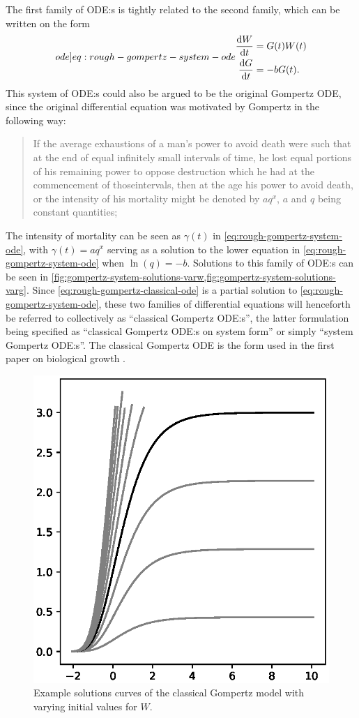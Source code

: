 The first family of ODE:s is tightly related to the second family, which can be written on the form
\begin{equation}
  \label[ode]{eq:rough-gompertz-system-ode}
  \begin{aligned} 
    \diff{W}{t} &= G(t) W(t)\\
    \diff{G}{t} &= -b G(t).
  \end{aligned}
\end{equation}
This system of ODE:s could also be argued to be the original Gompertz ODE, since the original differential equation  was motivated by Gompertz in the following way:
\blockquote[{\cite[518]{gompertz1825nature}}]{
  If the average exhaustions of a man's power to avoid death were such that at the end of equal infinitely small intervals of time, he lost equal portions of his remaining power to oppose destruction which he had at the commencement of thoseintervals, then at the age his power to avoid death, or the intensity of his mortality might be denoted by \(aq^x\), \(a\) and \(q\) being constant quantities;
}
The intensity of mortality can be seen as \(\gamma(t)\) in \cref{eq:rough-gompertz-system-ode}, with \(\gamma(t) = aq^x\) serving as a solution to the lower equation in \cref{eq:rough-gompertz-system-ode} when \(\ln(q) = -b\).
Solutions to this family of ODE:s can be seen in \cref{fig:gompertz-system-solutions-varw,fig:gompertz-system-solutions-varg}.
Since \cref{eq:rough-gompertz-classical-ode} is a partial solution to \cref{eq:rough-gompertz-system-ode}, these two families of differential equations will henceforth be referred to collectively as \enquote{classical Gompertz ODE:s}, the latter formulation being specified as \enquote{classical Gompertz ODE:s on system form} or simply \enquote{system Gompertz ODE:s}.
The classical Gompertz ODE is the form used in the first paper on biological growth \cite{davidson1928growth}.
\begin{figure}
  \centering
  \includegraphics[width=.32\textwidth]{images/gompertz-classical-solutions}
  \caption{Example solutions curves of the classical Gompertz model with varying initial values for \(W\).}
  \label{fig:gompertz-classical-solutions}
\end{figure}
